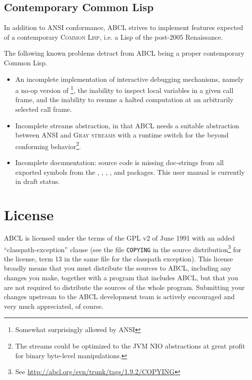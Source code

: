 \documentclass[10pt]{book}
\begin{document}
\subsection{Contemporary Common Lisp}
In addition to \textsc{ANSI} conformance, \textsc{ABCL} strives to implement
features expected of a contemporary \textsc{Common Lisp}, i.e. a Lisp of the
post-2005 Renaissance.

The following known problems detract from \textsc{ABCL} being a proper
contemporary Common Lisp.
\begin{itemize}
\item An incomplete implementation of interactive debugging
  mechanisms, namely a no-op version of \footnote{Somewhat
    surprisingly allowed by \textsc{ANSI}}, the inability to inspect
  local variables in a given call frame, and the inability to resume a
  halted computation at an arbitrarily selected call frame.
\item Incomplete streams abstraction, in that \textsc{ABCL} needs a
  suitable abstraction between \textsc{ANSI} and \textsc{Gray streams}
  with a runtime switch for the beyond conforming
  behavior\footnote{The streams could be optimized to the
    \textsc{JVM} NIO \cite{nio} abstractions at great profit for
    binary byte-level manipulations.}.
\item Incomplete documentation: source code is missing doc-strings from
  all exported symbols from the , ,
  , , and  packages.  This user
  manual is currently in draft status.
\end{itemize}



\section{License}

\textsc{ABCL} is licensed under the terms of the \textsc{GPL} v2 of
June 1991 with an added ``classpath-exception'' clause (see the file
\texttt{COPYING} in the source distribution\footnote{See
  \url{http://abcl.org/svn/trunk/tags/1.9.2/COPYING}} for the license,
term 13 in the same file for the classpath exception).  This license
broadly means that you must distribute the sources to \textsc{ABCL},
including any changes you make, together with a program that includes
\textsc{ABCL}, but that you are not required to distribute the sources
of the whole program.  Submitting your changes upstream to the \textsc{ABCL}
development team is actively encouraged and very much appreciated, of
course.
\end{document}
